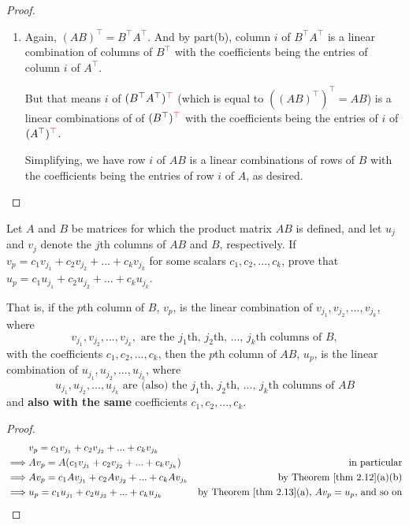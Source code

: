 \begin{proof}
\begin{enumerate}
\item Again, \((AB)^\top = B^\top A^\top\).
And by part(b), column \(i\) of \(B^\top A^\top\) is a linear combination of columns of \(B^\top\) with the coefficients being the entries of column \(i\) of \(A^\top\).

But that means  \(i\) of \((B^\top A^\top)^{\RED{\top}}\) (which is equal to \(((AB)^\top)^\top = AB\)) is a linear combinations of  of \((B^\top)^{\RED{\top}}\) with the coefficients being the entries of  \(i\) of \((A^\top)^{\RED{\top}}\).

Simplifying, we have row \(i\) of \(AB\) is a linear combinations of rows of \(B\) with the coefficients being the entries of row \(i\) of \(A\), as desired.

\end{enumerate}
\end{proof}

\begin{exercise} \label{exercise 2.3.15}
Let \(A\) and \(B\) be matrices for which the product matrix \(AB\) is defined, and let \(u_j\) and \(v_j\) denote the \(j\)th columns of \(AB\) and \(B\), respectively.
If \(v_p = c_1 v_{j_{1}} + c_2 v_{j_{2}} + ... + c_k v_{j_{k}}\) for some scalars \(c_1, c_2, ..., c_k\), prove that \(u_p = c_1 u_{j_{1}} + c_2 u_{j_{2}} + ... + c_k u_{j_{k}}\).
\end{exercise}

\begin{note}
That is, if the \(p\)th column of \(B\), \(v_p\), is the linear combination of \(v_{j_{1}}, v_{j_{2}}, ..., v_{j_{k}}\), where
\[
    v_{j_{1}}, v_{j_{2}}, ..., v_{j_{k}}, \text{ are the \(j_1\)th, \(j_2\)th, ..., \(j_k\)th columns of \(B\)}, 
\]
with the coefficients \(c_1, c_2, ..., c_k\),
then the \(p\)th column of \(AB\), \(u_p\), is the linear combination of \(u_{j_{1}}, u_{j_{2}}, ..., u_{j_{k}}\), where
\[
    u_{j_{1}}, u_{j_{2}}, ..., u_{j_{k}} \text{ are (also) the \(j_1\)th, \(j_2\)th, ..., \(j_k\)th columns of \(AB\)}
\]
and \textbf{also with the same} coefficients \(c_1, c_2, ..., c_k\).
\end{note}

\begin{proof}
\begin{align*}
             & v_p = c_1 v_{j_{1}} + c_2 v_{j_{2}} + ... + c_k v_{j_{k}} \\
    \implies & A v_p = A(c_1 v_{j_{1}} + c_2 v_{j_{2}} + ... + c_k v_{j_{k}}) & \text{in particular} \\
    \implies & A v_p = c_1 A v_{j_{1}} + c_2 A v_{j_{2}} + ... + c_k A v_{j_{k}} & \text{by \THM{2.12}(a)(b)} \\
    \implies & u_p = c_1 u_{j_1} + c_2 u_{j_2} + ... + c_k u_{j_k} & \text{by \THM{2.13}(a), \(A v_p = u_p\), and so on}
\end{align*}
\end{proof}

